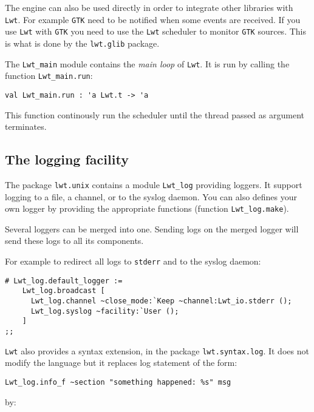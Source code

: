The engine can also be used directly in order to integrate other
libraries with {\tt Lwt}. For example {\tt GTK} need to be notified
when some events are received. If you use {\tt Lwt} with {\tt GTK}
you need to use the {\tt Lwt} scheduler to monitor {\tt GTK}
sources. This is what is done by the {\tt lwt.glib} package.



The {\tt Lwt\_main} module contains the \emph{main loop} of
{\tt Lwt}. It is run by calling the function {\tt Lwt\_main.run}:



\lstset{language=[Objective]Caml}\begin{lstlisting}
val Lwt_main.run : 'a Lwt.t -> 'a

\end{lstlisting}
This function continously run the scheduler until the thread passed
as argument terminates.



\subsection{ The logging facility }

The package {\tt lwt.unix} contains a module {\tt Lwt\_log}
providing loggers. It support logging to a file, a channel, or to the
syslog daemon. You can also defines your own logger by providing the
appropriate functions (function {\tt Lwt\_log.make}).



Several loggers can be merged into one. Sending logs on the merged
logger will send these logs to all its components.



For example to redirect all logs to {\tt stderr} and to the syslog
daemon:



\lstset{language=[Objective]Caml}\begin{lstlisting}
# Lwt_log.default_logger :=
    Lwt_log.broadcast [
      Lwt_log.channel ~close_mode:`Keep ~channel:Lwt_io.stderr ();
      Lwt_log.syslog ~facility:`User ();
    ]
;;

\end{lstlisting}
{\tt Lwt} also provides a syntax extension, in the package
{\tt lwt.syntax.log}. It does not modify the language but
it replaces log statement of the form:



\lstset{language=[Objective]Caml}\begin{lstlisting}
Lwt_log.info_f ~section "something happened: %s" msg

\end{lstlisting}
by:



